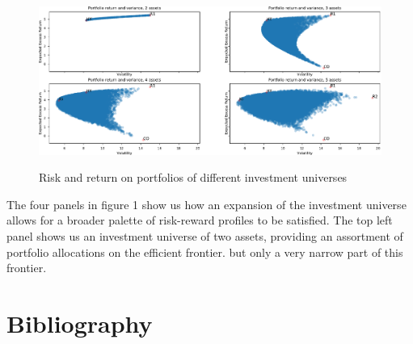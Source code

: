 \documentclass[11pt,a4paper,oneside]{article}
\begin{document}
\begin{figure}[ht]
\centering
\vspace{4mm}
\caption{Risk and return on portfolios of different investment universes}
\label{plot:pfAllocExample}
\includegraphics[scale=1]{images/pfAllocations.pdf}
\begingroup
\vspace{4mm}
\endgroup
\end{figure}

The four panels in figure 1 show us how an expansion of the investment universe allows for a broader palette of risk-reward profiles to be satisfied. The top left panel shows us an investment universe of two assets, providing an assortment of portfolio allocations on the efficient frontier. but only a very narrow part of this frontier.


\noindent


\section{Bibliography}
\end{document}
